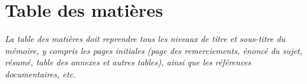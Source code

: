 \chapter*{Table des matières}

\textit{La table des matières doit reprendre tous les niveaux de titre et sous-titre du mémoire, y compris les pages initiales (page des remerciements, énoncé du sujet, résumé, table des annexes et autres tables), ainsi que les références documentaires, etc.}

\startcontents[default]

\startcontents[annexes]
\stopcontents[annexes]